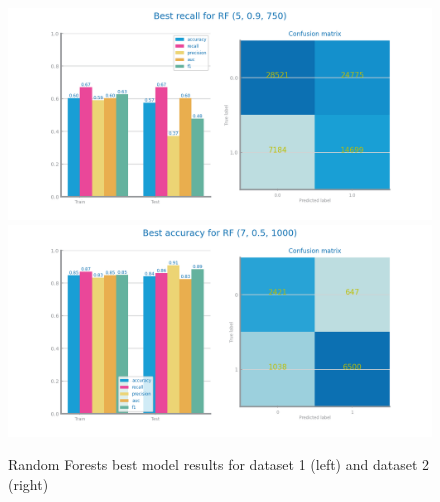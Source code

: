 \documentclass[10pt]{extarticle}
\begin{document}
\begin{figure}[H]
\centering\includegraphics[scale=0.95]{images/dataset1/models_evaluation/CovidPos_rf_RF_best_recall_eval.png}
\includegraphics[scale=0.95]{images/dataset2/models_evaluation/Credit_Score_rf_RF_best_accuracy_eval.png}
\caption{Random Forests best model results for dataset 1 (left) and dataset 2 (right)}
\end{figure}
\end{document}
